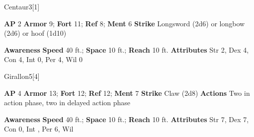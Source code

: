 \begin{monsection}{Centaur}{3}[1]
\vspace{-1em}\vspace{-1em}
\begin{spellcontent}
\begin{spelltargetinginfo}
{\textbf{AP} 2}
\pari \textbf{Armor} 9;
\textbf{Fort} 11;
\textbf{Ref} 8;
\textbf{Ment} 6
\pari \textbf{Strike} Longsword  (2d6) or longbow  (2d6) or hoof  (1d10)
\end{spelltargetinginfo}
\end{spellcontent}
\begin{spellsubcontent}
\begin{spellfooter}
\pari \textbf{Awareness} 
\pari \textbf{Speed} 40 ft.;
\textbf{Space} 10 ft.;
\textbf{Reach} 10 ft.
\pari \textbf{Attributes}
Str 2,
Dex 4,
Con 4,
Int 0,
Per 4,
Wil 0
\end{spellfooter}
\end{spellsubcontent}
\end{monsection}
\begin{monsection}{Girallon}{5}[4]
\vspace{-1em}\vspace{-1em}
\begin{spellcontent}
\begin{spelltargetinginfo}
{\textbf{AP} 4}
\pari \textbf{Armor} 13;
\textbf{Fort} 12;
\textbf{Ref} 12;
\textbf{Ment} 7
\pari \textbf{Strike} Claw  (2d8)
\pari \textbf{Actions} Two in action phase, two in delayed action phase
\end{spelltargetinginfo}
\end{spellcontent}
\begin{spellsubcontent}
\begin{spellfooter}
\pari \textbf{Awareness} 
\pari \textbf{Speed} 40 ft.;
\textbf{Space} 10 ft.;
\textbf{Reach} 10 ft.
\pari \textbf{Attributes}
Str 7,
Dex 7,
Con 0,
Int ,
Per 6,
Wil 
\end{spellfooter}
\end{spellsubcontent}
\end{monsection}
